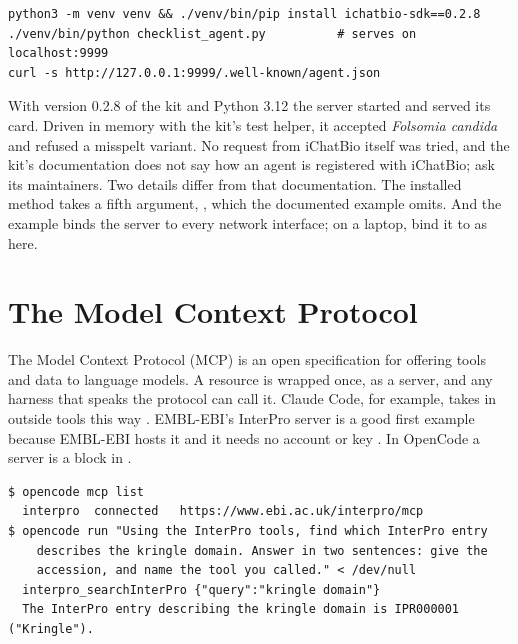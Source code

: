 \documentclass[11pt,a4paper]{article}
\begin{document}
\begin{lstlisting}[style=shell,caption={Install, run and check the card}]
python3 -m venv venv && ./venv/bin/pip install ichatbio-sdk==0.2.8
./venv/bin/python checklist_agent.py          # serves on localhost:9999
curl -s http://127.0.0.1:9999/.well-known/agent.json
\end{lstlisting}

With version 0.2.8 of the kit and Python 3.12 the server started and served
its card. Driven in memory with the kit's test helper, it accepted
\emph{Folsomia candida} and refused a misspelt variant. No request from
iChatBio itself was tried, and the kit's documentation does not say how an
agent is registered with iChatBio; ask its maintainers. Two details
differ from that documentation. The installed  method takes a fifth
argument, , which the documented example omits. And the
example binds the server to every network interface; on a laptop, bind it to
 as here.

\section{The Model Context Protocol}
\label{sec:mcp}

The Model Context Protocol (MCP) is an open specification for offering tools
and data to language models. A resource is wrapped once, as a server, and any
harness that speaks the protocol can call it. Claude Code, for example, takes
in outside tools this way \parencite{liu2026claudecode}. EMBL-EBI's InterPro
server is a good first example because EMBL-EBI hosts it and it needs no
account or key \parencite{interpro2026mcp}. In OpenCode a server is a block
in .



\begin{lstlisting}[style=shell,caption={Check the connection, then use it (output shortened)}]
$ opencode mcp list
  interpro  connected   https://www.ebi.ac.uk/interpro/mcp
$ opencode run "Using the InterPro tools, find which InterPro entry
    describes the kringle domain. Answer in two sentences: give the
    accession, and name the tool you called." < /dev/null
  interpro_searchInterPro {"query":"kringle domain"}
  The InterPro entry describing the kringle domain is IPR000001 ("Kringle").
\end{lstlisting}
\end{document}
